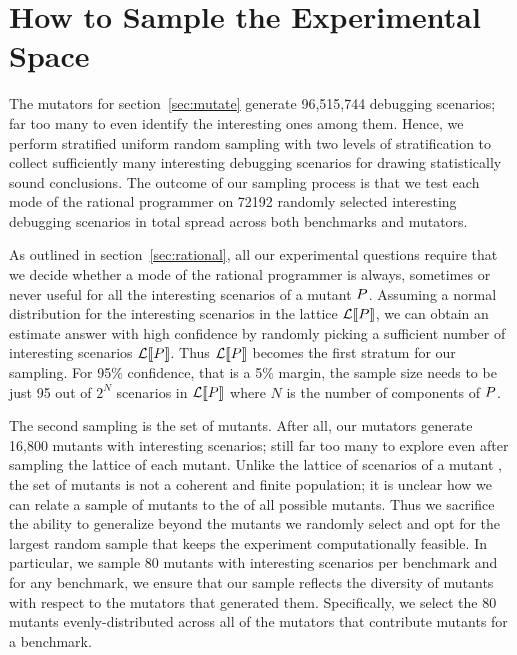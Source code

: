 \section{How to Sample the Experimental Space} 

The mutators for section~\ref{sec:mutate} generate 96,515,744 debugging scenarios; 
far too many to even identify the interesting ones among
them. Hence, we perform stratified uniform random sampling with two
levels of stratification to collect sufficiently many interesting
debugging scenarios for drawing statistically sound conclusions. 
The outcome of our sampling process is that we test each mode of the
rational programmer on 72192 randomly selected interesting debugging
scenarios in total spread across both benchmarks and mutators.



As outlined in section~\ref{sec:rational}, all our experimental questions
require that we decide whether a mode of the rational programmer is
always, sometimes or never useful for all the interesting scenarios of a
mutant $P$. Assuming a normal distribution for the 
interesting scenarios in the lattice $\mathcal{L}\llbracket P\rrbracket$, we can obtain an
estimate answer with high confidence by randomly picking a sufficient
number of interesting scenarios $\mathcal{L}\llbracket P\rrbracket$. Thus
$\mathcal{L}\llbracket P\rrbracket$ becomes the first stratum for our sampling. For
95\% confidence, that is a 5\% margin, the sample size needs
to be just 95 out of $2^N$ scenarios in $\mathcal{L}\llbracket P\rrbracket$ where $N$ is the
number of components of $P$.

The second sampling is the set of mutants. After all, our mutators
generate 16,800 mutants with
interesting scenarios; still far too many to explore even after sampling
the lattice of each mutant.  Unlike the lattice of scenarios of a mutant
, the set of mutants is not a coherent and finite population;  it is 
unclear how we can relate a sample of mutants to the
of all possible mutants. Thus we sacrifice the ability to generalize 
beyond the mutants we randomly select and opt for the largest random
sample that keeps the experiment computationally feasible. 
In particular,  we sample 80 mutants with interesting scenarios
per benchmark and for any benchmark, we ensure that our sample reflects the diversity of mutants with respect
to the mutators that generated them. Specifically, we select the 80 mutants evenly-distributed
across all of the mutators that contribute mutants for a benchmark.



